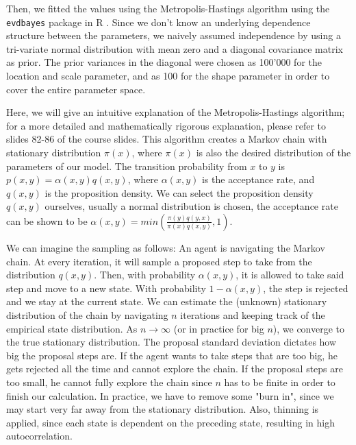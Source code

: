 \documentclass[10pt,conference,compsocconf]{IEEEtran}
\begin{document}
\par
Then, we fitted the values using the Metropolis-Hastings algorithm using the \texttt{evdbayes} package in R \cite{evdbayes}. Since we don't know an underlying dependence structure between the parameters, we naively assumed independence by using a tri-variate normal distribution with mean zero and a diagonal covariance matrix as prior. The prior variances in the diagonal were chosen as 100'000 for the location and scale parameter, and as 100 for the shape parameter in order to cover the entire parameter space. 
\par
Here, we will give an intuitive explanation of the Metropolis-Hastings algorithm; for a more detailed and mathematically rigorous explanation, please refer to slides 82-86 of the course slides. This algorithm creates a Markov chain with stationary distribution $\pi(x)$, where $\pi(x)$ is also the desired distribution of the parameters of our model. The transition probability from $x$ to $y$ is $p(x,y)=\alpha(x,y) q(x,y)$, where $\alpha(x,y)$ is the acceptance rate, and $q(x,y)$ is the proposition density. We can select the proposition density $q(x,y)$ ourselves, usually a normal distribution is chosen, the acceptance rate can be shown to be $\alpha(x,y)=min(\frac{\pi(y) q(y,x)}{\pi(x) q(x,y)},1)$.
\par
We can imagine the sampling as follows: An agent is navigating the Markov chain. At every iteration, it will sample a proposed step to take from the distribution $q(x,y)$. Then, with probability $\alpha(x,y)$, it is allowed to take said step and move to a new state. With probability $1-\alpha(x,y)$, the step is rejected and we stay at the current state. We can estimate the (unknown) stationary distribution of the chain by navigating $n$ iterations and keeping track of the empirical state distribution. As $n \to \infty$ (or in practice for big $n$), we converge to the true stationary distribution. The proposal standard deviation dictates how big the proposal steps are. If the agent wants to take steps that are too big, he gets rejected all the time and cannot explore the chain. If the proposal steps are too small, he cannot fully explore the chain since $n$ has to be finite in order to finish our calculation. In practice, we have to remove some "burn in", since we may start very far away from the stationary distribution. Also, thinning is applied, since each state is dependent on the preceding state, resulting in high autocorrelation. 
\par
\end{document}
